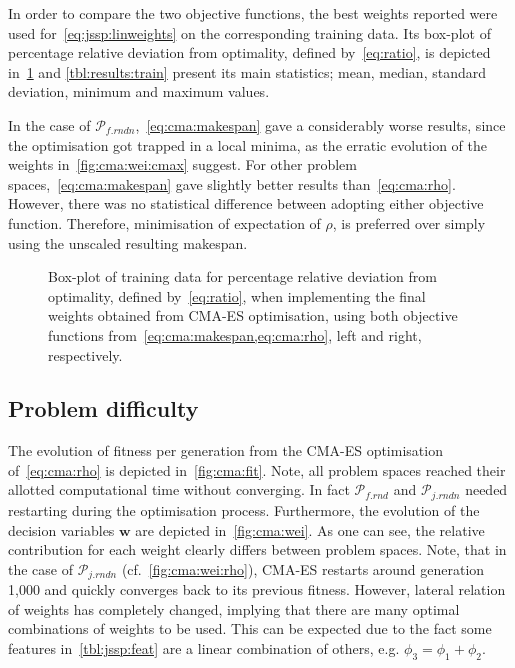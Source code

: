 \documentclass[a4paper,twoside]{article}
\renewcommand{\vec}[1]{\mathbf{#1}}
\begin{document}
In order to compare the two objective functions, the best weights reported were used for~\cref{eq:jssp:linweights} on the corresponding training data. Its box-plot of percentage relative deviation from optimality, defined by~\cref{eq:ratio}, is depicted in~\cref{fig:cma:trainboxpl} and \cref{tbl:results:train} present its main statistics; mean, median, standard deviation, minimum and maximum values.

In the case of $\mathcal{P}_{f.rndn}$,~\cref{eq:cma:makespan}  gave a considerably worse results, since the optimisation got trapped in a local minima, as the erratic evolution of the weights in~\cref{fig:cma:wei:cmax} suggest.
For other problem spaces,~\cref{eq:cma:makespan} gave slightly better results than~\cref{eq:cma:rho}. However, there was no statistical difference between adopting either objective function. Therefore, minimisation of expectation of $\rho$, is preferred over simply using the unscaled resulting makespan. 

\begin{figure}
\caption{Box-plot of training data for percentage relative deviation from optimality, defined by~\cref{eq:ratio}, when implementing the final weights obtained from CMA-ES optimisation, using both objective functions from~\cref{eq:cma:makespan,eq:cma:rho}, left and right, respectively.}\label{fig:cma:trainboxpl}
\end{figure}



\subsection{Problem difficulty}\label{sec:expr:data}
The evolution of fitness per generation from the CMA-ES optimisation of~\cref{eq:cma:rho} is depicted in~\cref{fig:cma:fit}. Note, all problem spaces reached their allotted computational time without converging. In fact $\mathcal{P}_{f.rnd}$ and $\mathcal{P}_{j.rndn}$ needed restarting during the optimisation process. 
Furthermore, the  evolution of the decision variables $\vec{w}$ are depicted in~\cref{fig:cma:wei}. As one can see, the relative contribution for each weight clearly differs between problem spaces. Note, that in the case of $\mathcal{P}_{j.rndn}$ (cf.~\cref{fig:cma:wei:rho}), CMA-ES restarts around generation 1,000 and quickly converges back to its previous fitness. However, lateral relation of weights has completely changed, implying that there are many optimal combinations of weights to be used. This can be expected due  to the fact some features in~\cref{tbl:jssp:feat} are a linear combination of others, e.g. $\phi_3=\phi_1+\phi_2$.
\end{document}
